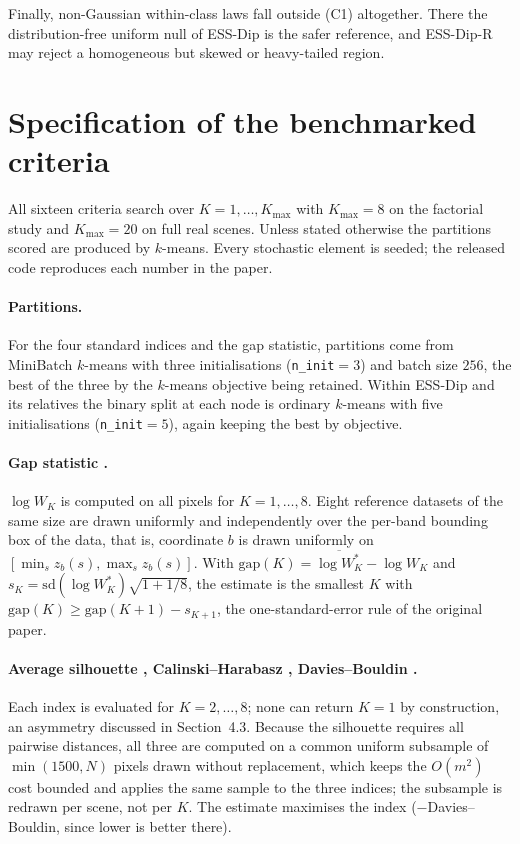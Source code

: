 \documentclass[11pt]{article}
\begin{document}
Finally, non-Gaussian within-class laws fall outside (C1) altogether. There the
distribution-free uniform null of ESS-Dip is the safer reference, and ESS-Dip-R
may reject a homogeneous but skewed or heavy-tailed region.

\section{Specification of the benchmarked criteria}\label{sec:supp-methods}

All sixteen criteria search over $K=1,\dots,K_{\max}$ with $K_{\max}=8$ on the
factorial study and $K_{\max}=20$ on full real scenes. Unless stated otherwise
the partitions scored are produced by $k$-means. Every stochastic element is
seeded; the released code reproduces each number in the paper.

\paragraph{Partitions.}
For the four standard indices and the gap statistic, partitions come from
MiniBatch $k$-means \citep{Sculley2010} with three initialisations
(\texttt{n\_init}${}=3$) and batch size $256$, the best of the three by the
$k$-means objective being retained. Within ESS-Dip and its relatives the
binary split at each node is ordinary $k$-means with five initialisations
(\texttt{n\_init}${}=5$), again keeping the best by objective.

\paragraph{Gap statistic \citep{Tibshirani2001}.}
$\log W_K$ is computed on all pixels for $K=1,\dots,8$. Eight reference
datasets of the same size are drawn uniformly and independently over the
per-band bounding box of the data, that is, coordinate $b$ is drawn uniformly
on $[\min_s z_b(s),\max_s z_b(s)]$. With
$\mathrm{gap}(K)=\overline{\log W^{\ast}_K}-\log W_K$ and
$s_K=\mathrm{sd}(\log W^{\ast}_K)\sqrt{1+1/8}$, the estimate is the smallest
$K$ with $\mathrm{gap}(K)\ge\mathrm{gap}(K+1)-s_{K+1}$, the one-standard-error
rule of the original paper.

\paragraph{Average silhouette \citep{Rousseeuw1987}, Calinski--Harabasz
\citep{CalinskiHarabasz1974}, Davies--Bouldin \citep{DaviesBouldin1979}.}
Each index is evaluated for $K=2,\dots,8$; none can return $K=1$ by
construction, an asymmetry discussed in Section~4.3. Because the silhouette
requires all pairwise distances, all three are computed on a common uniform
subsample of $\min(1500,N)$ pixels drawn without replacement, which keeps the
$O(m^{2})$ cost bounded and applies the same sample to the three indices; the
subsample is redrawn per scene, not per $K$. The estimate maximises the index
($-$Davies--Bouldin, since lower is better there).
\end{document}
